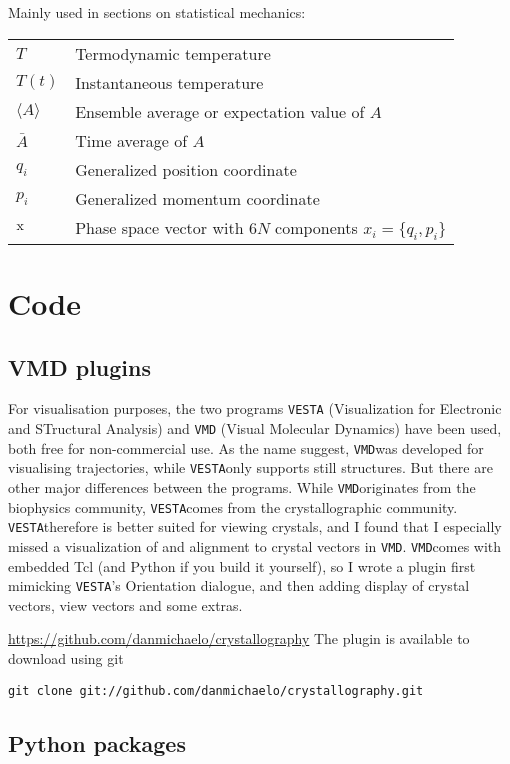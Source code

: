 \documentclass[11pt,bibliography=totoc,index=totoc]{scrbook}   %
\newcommand{\vesta}{{\texttt{VESTA}}} %
\newcommand{\vmd}{{\texttt{VMD}}} %
\begin{document}
  Mainly used in sections on statistical mechanics:
  
  \begin{tabular}{ll}
    $T$     & Termodynamic temperature \\
    $T(t)$  & Instantaneous temperature \\
    $\langle A \rangle$ & Ensemble average or expectation value of $A$\\
    $\bar{A}$ & Time average of $A$ \\
    $q_i$   & Generalized position coordinate \\
    $p_i$   & Generalized momentum coordinate \\
    $\mathrm{x}$ & Phase space vector with $6N$ components $x_i=\{q_i,p_i\}$
  \end{tabular}

\chapter{Code}

\section{VMD plugins}

For visualisation purposes, the two programs {\vesta} (Visualization for Electronic and STructural Analysis) and {\vmd} (Visual Molecular Dynamics) have been used, both free for non-commercial use.
As the name suggest, \vmd was developed for visualising trajectories, while \vesta only supports still structures.
But there are other major differences between the programs. While \vmd originates from the biophysics community, \vesta comes from the crystallographic community.
\vesta therefore is better suited for viewing crystals, and I found that I especially missed a visualization of and alignment to crystal vectors in \vmd.
\vmd comes with embedded Tcl (and Python if you build it yourself), so I wrote a plugin first mimicking \vesta's Orientation dialogue, and then adding 
display of crystal vectors, view vectors and some extras.

\url{https://github.com/danmichaelo/crystallography}
The plugin is available to download using git
\lstset{language=Bash}
\begin{lstlisting}
git clone git://github.com/danmichaelo/crystallography.git
\end{lstlisting}

\section{Python packages}
\end{document}

